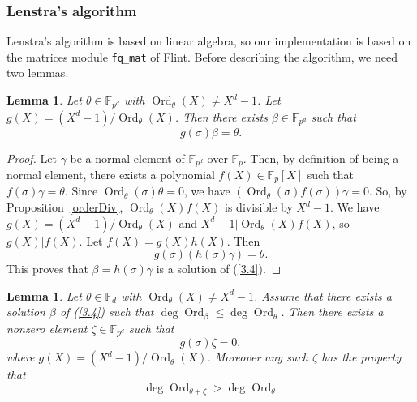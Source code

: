 \documentclass[a4paper,11pt]{article}
\theoremstyle{break}
\newtheorem{lm}[thm]{Lemma}
\theoremstyle{sc}
\theoremstyle{definition}
\theoremstyle{remark}
\DeclareMathOperator{\Ord}{Ord}
\begin{document}
\subsubsection{Lenstra's algorithm}

Lenstra's algorithm is based on linear algebra, so our implementation is based
on the matrices module \texttt{fq\_mat} of Flint. Before describing the
algorithm, we need two lemmas. 
\begin{lm}
  \label{lmExist}
  Let $\theta\in\mathbb{F}_{p^d}$ with $\Ord_\theta(X)\neq X^d-1$. Let
  $g(X)=(X^d-1)/\Ord_\theta(X)$. Then there exists
  $\beta\in\mathbb{F}_{p^d}$ such that
  \begin{equation}
    g(\sigma)\beta=\theta.
    \label{3.4}
  \end{equation}
\end{lm}
\begin{proof}
  Let $\gamma$ be a normal element of $\mathbb{F}_{p^d}$ over
  $\mathbb{F}_p$. Then, by definition of being a normal element, there
  exists a polynomial $f(X)\in\mathbb{F}_{p}[X]$ such that
  $f(\sigma)\gamma=\theta$. Since $\Ord_\theta(\sigma)\theta=0$, we have
  $(\Ord_\theta(\sigma)f(\sigma))\gamma=0$. So, by
  Proposition~\ref{orderDiv}, $\Ord_\theta(X)f(X)$ is
  divisible by $X^d-1$. We have $g(X)=(X^d-1)/\Ord_\theta(X)$ and $X^d-1|\Ord_\theta(X)f(X)$, so
$g(X)|f(X)$. Let $f(X)=g(X)h(X)$. Then
\[
  g(\sigma)(h(\sigma)\gamma)=\theta.
\]
This proves that $\beta=h(\sigma)\gamma$ is a solution of (\ref{3.4}).
\end{proof}
\begin{lm}
  \label{lmDegree}
  Let $\theta\in\mathbb{F}_{d}$ with $\Ord_\theta(X)\neq X^d-1$. Assume
  that there exists a solution $\beta$ of (\ref{3.4}) such that
  $\deg\Ord_{\beta}\leq\deg\Ord_{\theta}$. Then there exists a nonzero
  element $\zeta\in\mathbb{F}_{p^d}$ such that 
  \begin{equation}
    g(\sigma)\zeta=0,
    \label{3.5}
  \end{equation}
  where $g(X)=(X^d-1)/\Ord_\theta(X)$. Moreover any such $\zeta$ has the
  property that
  \begin{equation}
    \deg\Ord_{\theta+\zeta}>\deg\Ord_\theta
    \label{3.6}
  \end{equation}
\end{lm}
\end{document}
